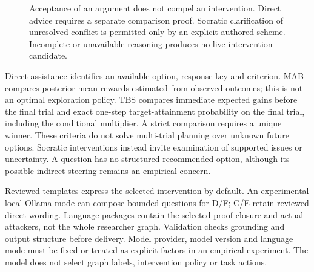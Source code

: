 \documentclass[11pt,a4paper]{article}
\begin{document}
\begin{figure}[H]
\caption{Acceptance of an argument does not compel an intervention. Direct advice requires a separate comparison proof. Socratic clarification of unresolved conflict is permitted only by an explicit authored scheme. Incomplete or unavailable reasoning produces no live intervention candidate.}
\label{fig:policy}
\end{figure}

Direct assistance identifies an available option, response key and criterion. MAB compares posterior mean rewards estimated from observed outcomes; this is not an optimal exploration policy. TBS compares immediate expected gains before the final trial and exact one-step target-attainment probability on the final trial, including the conditional multiplier. A strict comparison requires a unique winner. These criteria do not solve multi-trial planning over unknown future options. Socratic interventions instead invite examination of supported issues or uncertainty. A question has no structured recommended option, although its possible indirect steering remains an empirical concern.

Reviewed templates express the selected intervention by default. An experimental local Ollama mode can compose bounded questions for D/F; C/E retain reviewed direct wording. Language packages contain the selected proof closure and actual attackers, not the whole researcher graph. Validation checks grounding and output structure before delivery. Model provider, model version and language mode must be fixed or treated as explicit factors in an empirical experiment. The model does not select graph labels, intervention policy or task actions.
\end{document}
